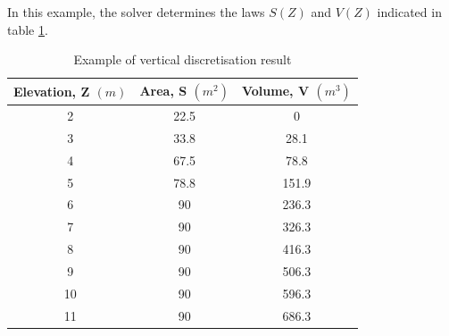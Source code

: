 \vspace{0.5cm}

In this example, the solver determines the laws $S(Z)$ and $V(Z)$ indicated in table \ref{ExPlan}.

\begin{table}
  \centering  
  \caption{Example of vertical discretisation result}
  \label{ExPlan}
  \vspace{0.25cm}
  \begin{tabular}{c|c|c}
  \textbf{Elevation, Z $(m)$} &\textbf{Area, S $(m^2)$} & \textbf{Volume, V $(m^3)$} \\
 \hline
  2 & 22.5 & 0 \\
  3 & 33.8 & 28.1 \\
  4 & 67.5 & 78.8 \\
  5 & 78.8 & 151.9 \\
  6 & 90 & 236.3 \\
  7 & 90 & 326.3 \\
  8 & 90 & 416.3 \\
  9 & 90 & 506.3 \\
 10 & 90 & 596.3 \\
 11 & 90 & 686.3 \\
  \hline
  \end{tabular}
\end{table}

